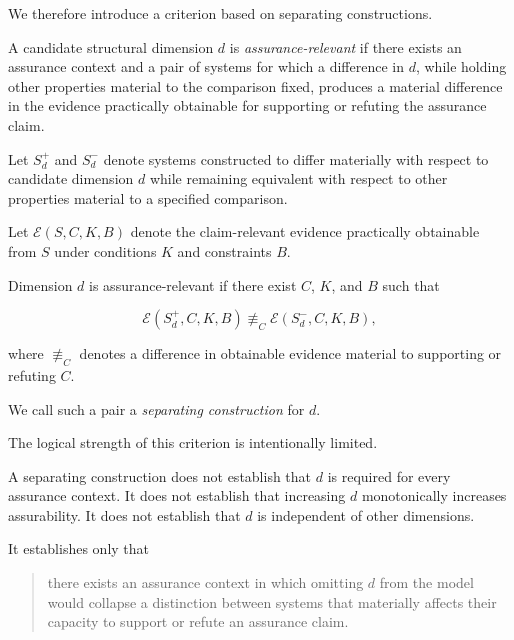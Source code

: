 We therefore introduce a criterion based on separating constructions.

\begin{definition}
  \label{se320.def.AssuranceRelevantStructuralDimension}
  A candidate structural dimension \(d\) is \emph{assurance-relevant}
  if there exists an assurance context and a pair of systems for which
  a difference in \(d\), while holding other properties material to
  the comparison fixed, produces a material difference in the evidence
  practically obtainable for supporting or refuting the assurance claim.
\end{definition}

Let \(S_d^{+}\) and \(S_d^{-}\) denote systems constructed to differ
materially with respect to candidate dimension \(d\) while remaining
equivalent with respect to other properties material to a specified comparison.

Let \(\mathcal{E}(S,C,K,B)\) denote the claim-relevant evidence
practically obtainable from \(S\) under conditions \(K\)
and constraints \(B\).

Dimension \(d\) is assurance-relevant if there exist \(C\), \(K\),
and \(B\) such that

\begin{equation}
  \mathcal{E}(S_d^{+},C,K,B)
  \not\equiv_C
  \mathcal{E}(S_d^{-},C,K,B),
  \label{eq:dimension-separation}
\end{equation}

where \(\not\equiv_C\) denotes a difference in obtainable evidence
material to supporting or refuting \(C\).

We call such a pair a \emph{separating construction} for \(d\).

The logical strength of this criterion is intentionally limited.

A separating construction does not establish that \(d\) is required
for every assurance context.
It does not establish that increasing \(d\) monotonically increases
assurability.
It does not establish that \(d\) is independent of other dimensions.

It establishes only that

\begin{quote}
  there exists an assurance context in which omitting \(d\) from
  the model would collapse a distinction between systems that
  materially affects their capacity to support or refute an
  assurance claim.
\end{quote}

